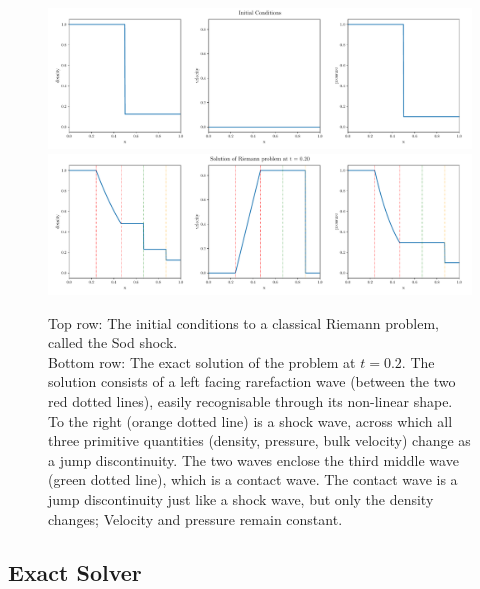 \begin{figure}
	\centering
	\includegraphics[width=.9\textwidth]{./figures/riemann_IC.pdf}%
	\\
	\includegraphics[width=.9\textwidth]{./figures/riemann_exact_solution.pdf}%
	\caption{
		Top row: The initial conditions to a classical Riemann problem, called the Sod shock.\\
%
		Bottom row: The exact solution of the problem at $t = 0.2$.
		The solution consists of a left facing rarefaction wave (between the two red dotted lines), easily recognisable through its non-linear shape.
		To the right (orange dotted line) is a shock wave, across which all three primitive quantities (density, pressure, bulk velocity) change as a jump discontinuity.
		The two waves enclose the third middle wave (green dotted line), which is a contact wave.
		The contact wave is a jump discontinuity just like a shock wave, but only the density changes; Velocity and pressure remain constant.
		\label{fig:riemann-solved}
		}%
\end{figure}















\subsection{Exact Solver}


